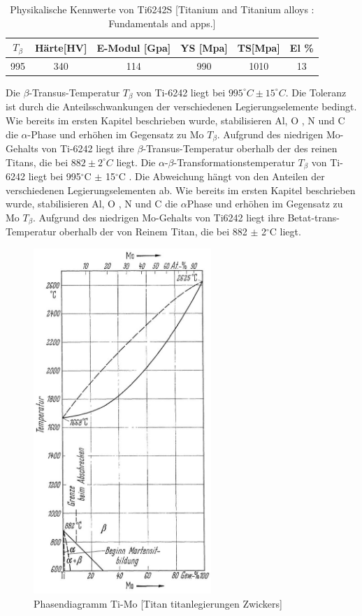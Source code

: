 \begin{table}[H]
	\centering	
	\begin{tabular}{|c| c| c| c| c| c|}										
		\hline
		$T_{\beta}$ & Härte[HV] & E-Modul [Gpa]& YS [Mpa]&TS[Mpa]& El \% \\
		\hline
		995&340&114&990&1010&13\\
		\hline
	\end{tabular}
	\caption{Physikalische Kennwerte von Ti6242S [Titanium and Titanium alloys  : Fundamentals and apps.]}
	\label{Mec.}
\end{table}

Die $\beta$-Transus-Temperatur $T_{\beta}$ von Ti-6242 liegt bei $995^\circ C \pm 15^\circ C$. Die Toleranz ist durch die Anteilsschwankungen der verschiedenen Legierungselemente bedingt. Wie bereits im ersten Kapitel beschrieben wurde, stabilisieren  Al, O , N und C die $\alpha$-Phase und erhöhen im Gegensatz zu Mo $T_{\beta}$.
Aufgrund des niedrigen Mo-Gehalts von Ti-6242 liegt ihre $\beta$-Transus-Temperatur oberhalb der des reinen Titans, die bei $882 \pm 2^\circ C$ liegt.
Die $\alpha$-$\beta$-Transformationstemperatur $T_{\beta}$ von Ti-6242 liegt bei 995$^\circ$C $\pm$ 15$^\circ$C . Die Abweichung hängt  von den Anteilen der verschiedenen Legierungselementen ab. Wie bereits im ersten Kapitel beschrieben wurde, stabilisieren  Al, O , N und C die $\alpha$Phase und erhöhen im Gegensatz zu Mo  {$T_{\beta}$}.
Aufgrund des niedrigen Mo-Gehalts von Ti6242 liegt ihre Betat-trans-Temperatur oberhalb der von Reinem Titan, die bei 882 $\pm$ 2$^\circ$C liegt.


\begin{figure}[H]
	\centering
	\includegraphics[width= 0.6\textwidth]{Bilder/TiMo}
	\caption{Phasendiagramm Ti-Mo [Titan titanlegierungen Zwickers]}
	\label{TiMo}
\end{figure}

